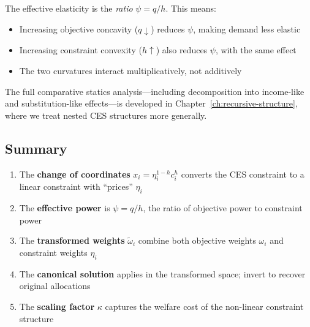 \begin{calloutnote}
The effective elasticity is the \emph{ratio} $\psi = q/h$. This means:
\begin{itemize}[leftmargin=*]
    \item Increasing objective concavity ($q \downarrow$) reduces $\psi$, making demand less elastic
    \item Increasing constraint convexity ($h \uparrow$) also reduces $\psi$, with the same effect
    \item The two curvatures interact multiplicatively, not additively
\end{itemize}
\end{calloutnote}

The full comparative statics analysis---including decomposition into income-like and substitution-like effects---is developed in Chapter~\ref{ch:recursive-structure}, where we treat nested CES structures more generally.

\subsection{Summary}
\label{subsec:ces-ces-summary}

\begin{calloutimportant}
\begin{enumerate}[label=(\roman*), leftmargin=*]
    \item The \textbf{change of coordinates} $x_i = \eta_i^{1-h} c_i^h$ converts the CES constraint to a linear constraint with ``prices'' $\eta_i$
    
    \item The \textbf{effective power} is $\psi = q/h$, the ratio of objective power to constraint power
    
    \item The \textbf{transformed weights} $\tilde{\omega}_i$ combine both objective weights $\omega_i$ and constraint weights $\eta_i$
    
    \item The \textbf{canonical solution} applies in the transformed space; invert to recover original allocations
    
    \item The \textbf{scaling factor} $\kappa$ captures the welfare cost of the non-linear constraint structure
\end{enumerate}
\end{calloutimportant}
